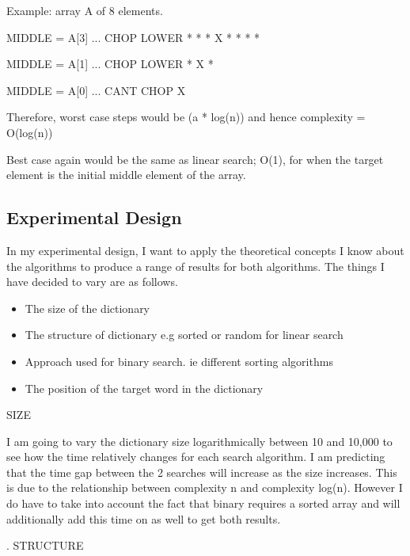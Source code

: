 \documentclass{article}
\begin{document}
Example: array A of 8 elements.\newline


MIDDLE = A[3] ... CHOP LOWER  * * * X * * * *\newline

MIDDLE = A[1] ... CHOP LOWER  * X *\newline

MIDDLE = A[0] ... CANT CHOP   X\newline


Therefore, worst case steps would be (a * log(n)) and hence complexity = O(log(n))\newline


Best case again would be the same as linear search; O(1), for when the target element is the initial middle element of the array.\newline


\subsection{Experimental Design}

In my experimental design, I want to apply the theoretical concepts I know about the algorithms to produce a range of results for both algorithms. The things I have decided to vary are as follows.\par

\begin{itemize}
    \item The size of the dictionary
    \item The structure of dictionary e.g sorted or random for linear search
    \item Approach used for binary search. ie different sorting algorithms
    \item The position of the target word in the dictionary
\end{itemize}{}

SIZE\newline


I am going to vary the dictionary size logarithmically between 10 and 10,000 to see how the time relatively changes for each search algorithm. I am predicting that the time gap between the 2 searches will increase as the size increases. This is due to the relationship between complexity n and complexity log(n). However I do have to take into account the fact that binary requires a sorted array and will additionally add this time on as well to get both results.\par
.\newline
STRUCTURE\newline
\end{document}

